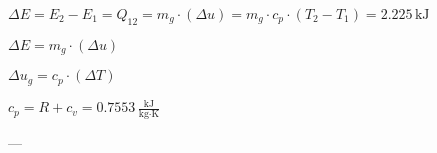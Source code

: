 \( \Delta E = E_2 - E_1 = Q_{12} = m_g \cdot (\Delta u) = m_g \cdot c_p \cdot (T_2 - T_1) = 2.225 \, \text{kJ} \)  

\( \Delta E = m_g \cdot (\Delta u) \)  

\( \Delta u_g = c_p \cdot (\Delta T) \)  

\( c_p = R + c_v = 0.7553 \, \frac{\text{kJ}}{\text{kg·K}} \)  

---